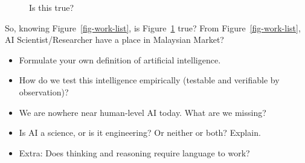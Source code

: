 \documentclass[
  paper=6in:9in,
  pagesize=pdftex,
  headinclude=on,
  footinclude=on,
  12pt]{scrbook}
\providecommand{\tightlist}{%
  \setlength{\itemsep}{0pt}\setlength{\parskip}{0pt}}\usepackage{longtable,booktabs,array}
\begin{document}
\begin{figure}[H]


\caption{\label{fig-meme3-gaji}Is this true?}

\end{figure}%

So, knowing Figure~\ref{fig-work-list}, is Figure~\ref{fig-meme3-gaji}
true? From Figure~\ref{fig-work-list}, AI Scientist/Researcher have a
place in Malaysian Market?

\begin{tcolorbox}[enhanced jigsaw, colbacktitle=quarto-callout-important-color!10!white, arc=.35mm, opacitybacktitle=0.6, titlerule=0mm, opacityback=0, bottomtitle=1mm, title=\textcolor{quarto-callout-important-color}{\faExclamation}\hspace{0.5em}{Exercises}, breakable, toptitle=1mm, colback=white, rightrule=.15mm, colframe=quarto-callout-important-color-frame, left=2mm, bottomrule=.15mm, toprule=.15mm, leftrule=.75mm, coltitle=black]

\begin{itemize}
\tightlist
\item
  Formulate your own definition of artificial intelligence.
\item
  How do we test this intelligence empirically (testable and verifiable
  by observation)?
\item
  We are nowhere near human-level AI today. What are we missing?
\item
  Is AI a science, or is it engineering? Or neither or both? Explain.
\item
  Extra: Does thinking and reasoning require language to work?
\end{itemize}

\end{tcolorbox}
\end{document}
